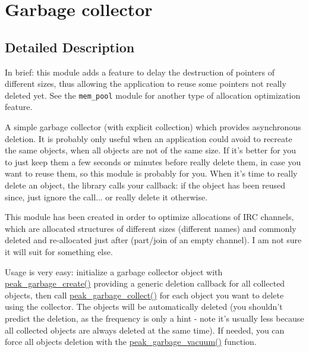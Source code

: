 \hypertarget{group__garbage}{
\section{Garbage collector}
\label{group__garbage}
}


\subsection{Detailed Description}
\begin{Desc}
\item[]In brief: this module adds a feature to delay the destruction of pointers of different sizes, thus allowing the application to reuse some pointers not really deleted yet. See the {\tt mem\_\-pool} module for another type of allocation optimization feature.\end{Desc}
\begin{Desc}
\item[]A simple garbage collector (with explicit collection) which provides asynchronous deletion. It is probably only useful when an application could avoid to recreate the same objects, when all objects are not of the same size. If it's better for you to just keep them a few seconds or minutes before really delete them, in case you want to reuse them, so this module is probably for you. When it's time to really delete an object, the library calls your callback: if the object has been reused since, just ignore the call... or really delete it otherwise.\end{Desc}
\begin{Desc}
\item[]This module has been created in order to optimize allocations of IRC channels, which are allocated structures of different sizes (different names) and commonly deleted and re-allocated just after (part/join of an empty channel). I am not sure it will suit for something else.\end{Desc}
\begin{Desc}
\item[]Usage is very easy: initialize a garbage collector object with \hyperlink{group__garbage_ga9}{peak\_\-garbage\_\-create()} providing a generic deletion callback for all collected objects, then call \hyperlink{group__garbage_ga10}{peak\_\-garbage\_\-collect()} for each object you want to delete using the collector. The objects will be automatically deleted (you shouldn't predict the deletion, as the frequency is only a hint - note it's usually less because all collected objects are always deleted at the same time). If needed, you can force all objects deletion with the \hyperlink{group__garbage_ga12}{peak\_\-garbage\_\-vacuum()} function. \end{Desc}


